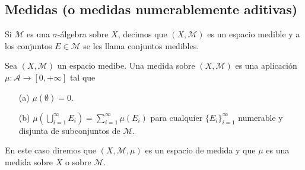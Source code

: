 \subsection{Medidas (o medidas numerablemente aditivas)}
\begin{defi}
    Si $\mathcal{M}$ es una $\sigma$-álgebra sobre $X$, decimos que $(X, \mathcal{M})$ es un espacio medible y a los conjuntos $E \in \mathcal{M}$ se les llama conjuntos medibles.
\end{defi}
\begin{defi}
    Sea $(X, \mathcal{M})$ un espacio medibe. Una medida sobre $(X, \mathcal{M})$ es una aplicación $\mu : \mathcal{A} \longrightarrow [0, +\infty]$ tal que
    \begin{enumerate}
        \item[(a)] $\mu (\emptyset) = 0$.
        \item[(b)] $\mu \left(\bigcup_{i=1}^{\infty}{E_i} \right) = \sum_{i=1}^{\infty} \mu(E_i)$ para cualquier $\{ E_i \}_{i=1}^{\infty}$ numerable y disjunta de subconjuntos de $\mathcal{M}$.
    \end{enumerate}
    En este caso diremos que $(X, \mathcal{M}, \mu)$ es un espacio de medida y que $\mu$ es una medida sobre $X$ o sobre $\mathcal{M}$.
\end{defi}
